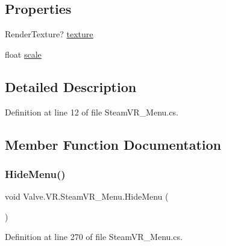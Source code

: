 \subsection*{Properties}
\begin{DoxyCompactItemize}
\item 
Render\+Texture? \mbox{\hyperlink{class_valve_1_1_v_r_1_1_steam_v_r___menu_a4f4448df5c5bcf39301b4ac174192bc1}{texture}}
\item 
float \mbox{\hyperlink{class_valve_1_1_v_r_1_1_steam_v_r___menu_a2dfe51b00cc718973cd71ff4a4d224b8}{scale}}
\end{DoxyCompactItemize}


\subsection{Detailed Description}


Definition at line 12 of file Steam\+V\+R\+\_\+\+Menu.\+cs.



\subsection{Member Function Documentation}
\mbox{\label{class_valve_1_1_v_r_1_1_steam_v_r___menu_ae2237ecbd2db4185cbe6339ee44bdd62}} 
\subsubsection{\texorpdfstring{HideMenu()}{HideMenu()}}
{\footnotesize\ttfamily void Valve.\+V\+R.\+Steam\+V\+R\+\_\+\+Menu.\+Hide\+Menu (\begin{DoxyParamCaption}{ }\end{DoxyParamCaption})}



Definition at line 270 of file Steam\+V\+R\+\_\+\+Menu.\+cs.

\mbox{\label{class_valve_1_1_v_r_1_1_steam_v_r___menu_a4c23a751292b781004745d870d6157b6}} 
